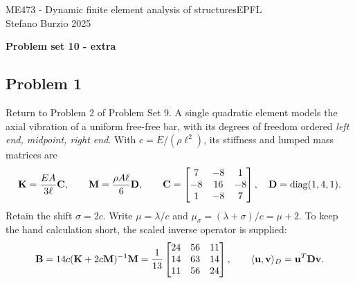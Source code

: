 \documentclass[12pt]{article}
\begin{document}
\noindent ME473 - Dynamic finite element analysis of structures\hfill EPFL\\
Stefano Burzio \hfill 2025\\
\vspace{0.3cm}

\hspace*{\fill}\textbf{\Large Problem set 10 - extra}\hspace*{\fill}

\hrulefill

\subsection*{Problem 1}

Return to Problem 2 of Problem Set 9. A single quadratic element models the axial vibration of a uniform free-free bar, with its degrees of freedom ordered \emph{left end, midpoint, right end}. With $c=E/(\rho\ell^2)$, its stiffness and lumped mass matrices are
\[
  \mathbf{K}=\frac{EA}{3\ell}\mathbf{C},\qquad
  \mathbf{M}=\frac{\rho A\ell}{6}\mathbf{D},\qquad
  \mathbf{C}=\begin{bmatrix}7&-8&1\\-8&16&-8\\1&-8&7\end{bmatrix},\quad
  \mathbf{D}=\operatorname{diag}(1,4,1).
\]
Retain the shift $\sigma=2c$. Write $\mu=\lambda/c$ and
$\mu_\sigma=(\lambda+\sigma)/c=\mu+2$. To keep the hand calculation short,
the scaled inverse operator is supplied:
\[
  \mathbf{B}=14c(\mathbf{K}+2c\mathbf{M})^{-1}\mathbf{M}
  =\frac1{13}\begin{bmatrix}24&56&11\\14&63&14\\11&56&24\end{bmatrix},
  \qquad \langle\mathbf{u},\mathbf{v}\rangle_D=\mathbf{u}^{T}\mathbf{D}\mathbf{v} .
\]
\end{document}
